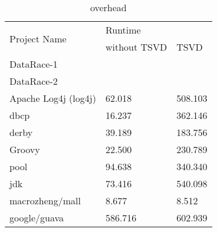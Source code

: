 \begin{table}
	\centering
	\caption{overhead}
	\label{table:overhead}
	\begin{tabular}{|l|ll|}
		\hline
		\multirow{2}{*}{Project Name}                                                                & \multicolumn{2}{l|}{Runtime}                  \\ \cline{2-3} 
		                                                                                             & \multicolumn{1}{l|}{without TSVD} & TSVD      \\ \hline
													     DataRace-1                                                                                   & \multicolumn{1}{l|}{}             &           \\ \hline
													     DataRace-2                                                                                   & \multicolumn{1}{l|}{}             &           \\ \hline
													     Apache Log4j (log4j)                                                                         & \multicolumn{1}{l|}{62.018}       & 508.103   \\ \hline
													     dbcp                                                                                         & \multicolumn{1}{l|}{16.237}       & 362.146   \\ \hline
													     derby                                                                                        & \multicolumn{1}{l|}{39.189}       & 183.756   \\ \hline
													     Groovy                                                                                       & \multicolumn{1}{l|}{22.500}       & 230.789   \\ \hline
													     pool                                                                                         & \multicolumn{1}{l|}{94.638}       & 340.340   \\ \hline
													     jdk                                                                                          & \multicolumn{1}{l|}{73.416}       & 540.098   \\ \hline
													     macrozheng/mall                                                                              & \multicolumn{1}{l|}{8.677}        & 8.512     \\ \hline
													     google/guava                                                                                 & \multicolumn{1}{l|}{586.716}      & 602.939   \\ \hline

\end{tabular}
\end{table}
